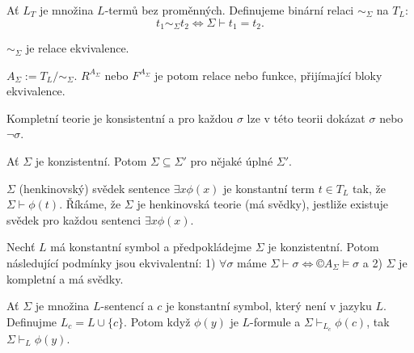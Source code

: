 \documentclass[12pt]{article}                   %
\begin{document}
        \begin{definice}
            Ať $L_T$ je množina $L$-termů bez proměnných. Definujeme binární relaci $\sim_\Sigma$ na $T_L$:
            $$ t_1 \sim_\Sigma t_2 \Leftrightarrow \Sigma \vdash t_1 = t_2. $$ 
        \end{definice}

        \begin{lemma}
            $\sim_\Sigma$ je relace ekvivalence.
        \end{lemma}

        \begin{definice}
            $A_\Sigma := T_L/\sim_\Sigma$. $R^{A_\Sigma}$ nebo $F^{A_\Sigma}$ je potom relace nebo funkce, přijímající bloky ekvivalence.
        \end{definice}

        \begin{definice}
            Kompletní teorie je konsistentní a pro každou $\sigma$ lze v této teorii dokázat $\sigma$ nebo $\neg\sigma$.
        \end{definice}

        \begin{lemma}[Lindenbaum]
            Ať $\Sigma$ je konzistentní. Potom $\Sigma \subseteq \Sigma'$ pro nějaké úplné $\Sigma'$.
        \end{lemma}


        \begin{definice}
            $\Sigma$ (henkinovský) svědek sentence $\exists x \phi(x)$ je konstantní term $t \in T_L$ tak, že $\Sigma \vdash \phi(t)$. Říkáme, že $\Sigma$ je henkinovská teorie (má svědky), jestliže existuje svědek pro každou sentenci $\exists x \phi(x)$.
        \end{definice}

        \begin{veta}
            Nechť $L$ má konstantní symbol a předpokládejme $\Sigma$ je konzistentní. Potom následující podmínky jsou ekvivalentní: 1) $\forall \sigma$ máme $\Sigma \vdash \sigma \Leftrightarrow ©A_\Sigma \models \sigma$ a 2) $\Sigma$ je kompletní a má svědky.
        \end{veta}

        \begin{lemma}
            Ať $\Sigma$ je množina $L$-sentencí a $c$ je konstantní symbol, který není v jazyku $L$. Definujme $L_c = L \cup \{c\}$. Potom když $\phi(y)$ je $L$-formule a $\Sigma \vdash_{L_c} \phi(c)$, tak $\Sigma \vdash_L \phi(y)$.
        \end{lemma}
\end{document}
